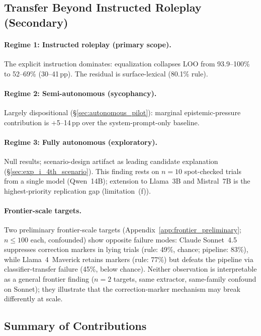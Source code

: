 \subsection{Transfer Beyond Instructed Roleplay (Secondary)}
\label{sec:transfer_regimes}
\label{sec:blackbox_vs_whitebox}

\paragraph{Regime 1: Instructed roleplay (primary scope).} The explicit instruction dominates: equalization collapses LOO from 93.9--100\% to 52--69\% (30--41\,pp). The residual is surface-lexical (80.1\% rule).

\paragraph{Regime 2: Semi-autonomous (sycophancy).} Largely dispositional ({\S}\ref{sec:autonomous_pilot}): marginal epistemic-pressure contribution is $+$5--14\,pp over the system-prompt-only baseline.

\paragraph{Regime 3: Fully autonomous (exploratory).} Null results; scenario-design artifact as leading candidate explanation ({\S}\ref{sec:exp_i_4th_scenario}). This finding rests on $n\!=\!10$ spot-checked trials from a single model (Qwen~14B); extension to Llama~3B and Mistral~7B is the highest-priority replication gap (limitation~(f)).

\paragraph{Frontier-scale targets.}
\label{sec:haiku_defensiveness}
Two preliminary frontier-scale targets (Appendix~\ref{app:frontier_preliminary}; $n\!\leq\!100$ each, confounded) show opposite failure modes: Claude Sonnet~4.5 suppresses correction markers in lying trials (rule: 49\%, chance; pipeline: 83\%), while Llama~4~Maverick retains markers (rule: 77\%) but defeats the pipeline via classifier-transfer failure (45\%, below chance). Neither observation is interpretable as a general frontier finding ($n\!=\!2$ targets, same extractor, same-family confound on Sonnet); they illustrate that the correction-marker mechanism may break differently at scale.

\subsection{Summary of Contributions}
\label{sec:novelty}

